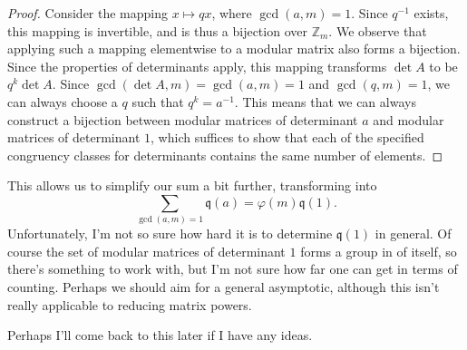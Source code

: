 \documentclass[a4paper, 12pt]{article}
\begin{document}
\begin{proof}
    Consider the mapping \( x \mapsto qx \), where \( \gcd(a, m) = 1 \). Since \( q^{-1} \) exists, this mapping is invertible, and is thus a bijection over \( \mathbb{Z}_m \). We observe that applying such a mapping elementwise to a modular matrix also forms a bijection. Since the properties of determinants apply, this mapping transforms \( \det A \) to be \( q^k \det A \). Since \( \gcd(\det A, m) = \gcd(a, m) = 1 \) and \( \gcd(q, m) = 1 \), we can always choose a \( q \) such that \( q^k = a^{-1} \). This means that we can always construct a bijection between modular matrices of determinant \( a \) and modular matrices of determinant \( 1 \), which suffices to show that each of the specified congruency classes for determinants contains the same number of elements.
\end{proof}
This allows us to simplify our sum a bit further, transforming into
\[
    \sum_{\gcd(a, m) = 1} \mathfrak{q} (a) = \varphi(m) \mathfrak{q}(1)
.\]
Unfortunately, I'm not so sure how hard it is to determine \( \mathfrak{q}(1) \) in general. Of course the set of modular matrices of determinant \( 1 \) forms a group in of itself, so there's something to work with, but I'm not sure how far one can get in terms of counting. Perhaps we should aim for a general asymptotic, although this isn't really applicable to reducing matrix powers.

Perhaps I'll come back to this later if I have any ideas.
\end{document}
